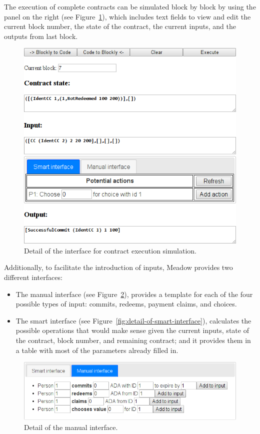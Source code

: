 \documentclass[
      acmsmall
    , screen
  ]{acmart}
\begin{document}
The execution of complete contracts can be simulated block by block
by using the panel on the right (see Figure~\ref{fig:detail-of-interface}),
which includes text fields to view and edit the current block number,
the state of the contract, the current inputs, and the outputs from
last block.

\begin{figure}
\centering{}\includegraphics[scale=0.5]{pix/detail2}\caption{\label{fig:detail-of-interface}Detail of the interface for 
contract
execution simulation.}
\end{figure}

Additionally, to facilitate the introduction of inputs, Meadow provides
two different interfaces:
\begin{itemize}
\item The manual interface (see Figure~\ref{fig:detail-of-manual-interface}),
provides a template for each of the four possible types of input:
commits, redeems, payment claims, and choices.
\item The smart interface (see Figure~\ref{fig:detail-of-smart-interface}),
calculates the possible operations that would make sense given the
current inputs, state of the contract, block number, and remaining
contract; and it provides them in a table with most of the parameters
already filled in.
\end{itemize}
\begin{figure}
\begin{centering}
\includegraphics[scale=0.5]{pix/detail3}
\par\end{centering}
\caption{\label{fig:detail-of-manual-interface}Detail of the manual interface.}
\end{figure}
\end{document}
